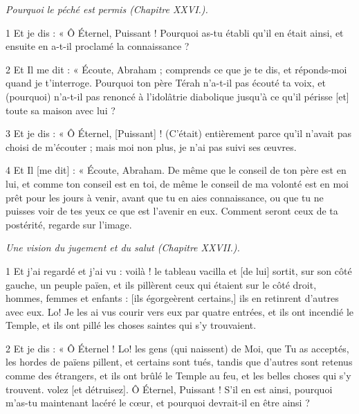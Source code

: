 
\par \textit{Pourquoi le péché est permis (Chapitre XXVI.).}

\par 1 Et je dis : « Ô Éternel, Puissant ! Pourquoi as-tu établi qu’il en était ainsi, et ensuite en a-t-il proclamé la connaissance ?

\par 2 Et Il me dit : « Écoute, Abraham ; comprends ce que je te dis, et réponds-moi quand je t'interroge. Pourquoi ton père Térah n'a-t-il pas écouté ta voix, et (pourquoi) n'a-t-il pas renoncé à l'idolâtrie diabolique jusqu'à ce qu'il périsse [et] toute sa maison avec lui ?

\par 3 Et je dis : « Ô Éternel, [Puissant] ! (C'était) entièrement parce qu'il n'avait pas choisi de m'écouter ; mais moi non plus, je n’ai pas suivi ses œuvres.

\par 4 Et Il [me dit] : « Écoute, Abraham. De même que le conseil de ton père est en lui, et comme ton conseil est en toi, de même le conseil de ma volonté est en moi prêt pour les jours à venir, avant que tu en aies connaissance, ou que tu ne puisses voir de tes yeux ce que est l'avenir en eux. Comment seront ceux de ta postérité, regarde sur l’image.


\par \textit{Une vision du jugement et du salut (Chapitre XXVII.).}

\par 1 Et j'ai regardé et j'ai vu : voilà ! le tableau vacilla et [de lui] sortit, sur son côté gauche, un peuple païen, et ils pillèrent ceux qui étaient sur le côté droit, hommes, femmes et enfants : [ils égorgeèrent certains,] ils en retinrent d'autres avec eux. Lo! Je les ai vus courir vers eux par quatre entrées, et ils ont incendié le Temple, et ils ont pillé les choses saintes qui s'y trouvaient.

\par 2 Et je dis : « Ô Éternel ! Lo! les gens (qui naissent) de Moi, que Tu as acceptés, les hordes de païens pillent, et certains sont tués, tandis que d'autres sont retenus comme des étrangers, et ils ont brûlé le Temple au feu, et les belles choses qui s'y trouvent. volez [et détruisez]. Ô Éternel, Puissant ! S’il en est ainsi, pourquoi m’as-tu maintenant lacéré le cœur, et pourquoi devrait-il en être ainsi ?

